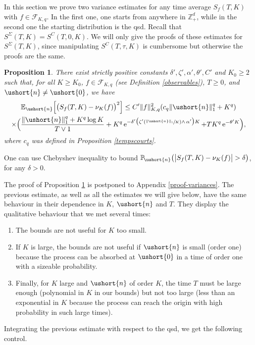 \documentclass[11pt]{article}
\newcommand{\Psfrac}[2]{(\sfrac{#1}{#2})}
\newcommand{\scaleto}[2]{#1}
\numberwithin{equation}{section}
\theoremstyle{plain}
\newtheorem{proposition}[theorem]{Proposition}
\theoremstyle{definition}
\newcommand{\proba}{{\mathbb{P}}}
\newcommand{\E}{{\mathbb{E}}}
\newcommand{\zentiers}{{\mathbb{Z}}}
\newcommand{\domaine}{\zentiers_{+}^{d}}
\newcommand{\sK}{K}
\newcommand{\vecn}{\ushort{n}}
\newcommand{\veczer}{\ushort{0}}
\newcommand{\nuk}{\nu_{K}}\let\snuk\nuk
\newcommand{\e}{\operatorname{e}}
\newcommand{\norm}[1]{\|#1\|_{1}}\let\snorm\norm
\begin{document}
In this section we prove two variance estimates for any time average $S_{f}(T,K)$ with $f\in \mathscr{F}\!_{\sK,q}$.
In the first one, one starts from anywhere in $\domaine$, while in the second one the starting distribution is the qsd.
Recall that $S^{{ \Sigma}}(T,K)=S^{C}(T,0,K)$. We will only give the proofs of these
estimates for $S^{{ \Sigma}}(T,K)$, since manipulating $S^{C}(T,\tau,K)$ is cumbersome but
otherwise the proofs are the same.

\begin{proposition}\label{varcorn}
There exist strictly positive constants $\delta', \zeta', \alpha', \theta', C'$ and $K_0\geq 2$ such that, for all $K\geq K_0$,
$f\!\in\!\mathscr{F}\!_{\sK,q}$ (see Definition \ref{observables}), $T\geq 0$, and $\vecn\neq \veczer$, we have%
\begin{multline*}
\E_{\vecn}\Bigl[\bigl(S_{f}(T,K)-\nuk(f)\bigr)^2\Bigr]
\leq C' \|f\|_{\sK,q}^2(c_q\norm{\vecn}^{\scaleto{q}{3.8pt}} +K^q)\\
\times
\Bigl(
\frac{\norm{\vecn}^{\scaleto{q}{3.6pt}} +K^q \log K}{T\vee 1}+
K^q \e^{-\delta'\bigl(\zeta' \Psfrac{\|\vecn\|_{1}}{K}\wedge \,\alpha'\bigr)K}+ T K^q \e^{-\theta' K}
\Bigr),
\end{multline*}
where $c_q$ was defined in Proposition \ref{tempscourts}.
\end{proposition}

One can use Chebyshev inequality to bound $\proba_{\!\vecn}\bigl(\big|S_{f}(T,K)-\nuk(f)\big|>\delta\bigr)$,
for any $\delta>0$.

The proof of Proposition \ref{varcorn} is postponed to Appendix \ref{proof-variances}.
The previous estimate, as well as all the estimates we will give below, have the same behaviour in their dependence in $K$, $\vecn$ and
$T$. They display the qualitative behaviour that we met several times:
\begin{enumerate}
\item The bounds are not useful for $K$ too small.
\item If $K$ is large, the bounds are not useful if $\vecn$ is small (order one) because the process can be absorbed at
$\veczer$ in a time of order one with a sizeable probability.
\item Finally, for $K$ large and $\vecn$ of order $K$, the time $T$ must be large enough (polynomial in $K$ in
our bounds) but not too large (less than an exponential in $K$ because the process can reach the origin with high probability in
such large times).
\end{enumerate}
Integrating the previous estimate with respect to the qsd, we get the following control.
\end{document}

